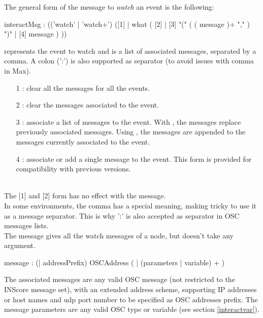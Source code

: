 \documentclass[a4paper,twoside]{report}
\begin{document}
The general form of the message to \textit{watch} an event is the following:


\begin{rail}
interactMsg : (('watch' | 'watch+')  ([1] | 
					what  ( [2] 
							| [3] "(" ( ( message  )+ "," ) ")" 
							| [4] message )  )) 
\end{rail}

 represents the event to watch and  is a list of associated messages, separated by a comma. A colon (':') is also supported as separator (to avoid issues with comma in Max).

\begin{itemize}
\item [1]: clear all the messages for all the events.
\item [2]: clear the messages associated to the  event.
\item [3]: associate a list of messages to the  event. With , the messages replace previously associated messages. Using , the messages are appended to the messages currently associated to the event.
\item [4]: associate or add a single message to the  event. This form is provided for compatibility with previous versions.
\end{itemize}

\note{} \\
	The [1] and [2] form has no effect with the  message. \\
	In some environments, the comma has a special meaning, making tricky to use it as a message separator. This is why ':' is also accepted as separator in OSC messages lists. \\
	The  message gives all the watch messages of a node, but doesn't take any argument.

\begin{rail} 
message : (| addressPrefix)  OSCAddress ( | (parameters | variable) + )
\end{rail}

The associated messages are any valid OSC message (not restricted to the INScore message set), with an extended address scheme, supporting IP addresses or host names and udp port number to be specified as OSC addresses prefix. The message parameters are any valid OSC type or variable (see section \ref{interactvar}).
\end{document}
